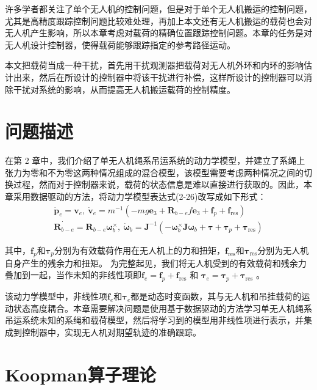 \documentclass[lang=chs, degree=master, blindreview=false, winfonts=true]{yanputhesis}
\begin{document}
许多学者都关注了单个无人机的控制问题，但是对于单个无人机搬运的控制问题，尤其是高精度跟踪控制问题比较难处理，再加上本文还有无人机搬运的载荷也会对无人机产生影响，所以本章考虑对载荷的精确位置跟踪控制问题。本章的任务是对无人机设计控制器，使得载荷能够跟踪指定的参考路径运动。 

本文把载荷当成一种干扰，首先用干扰观测器把载荷对无人机外环和内环的影响估计出来，然后在所设计的控制器中将该干扰进行补偿，这样所设计的控制器可以消除干扰对系统的影响，从而提高无人机搬运载荷的控制精度。

\section{问题描述}
在第 2 章中，我们介绍了单无人机绳系吊运系统的动力学模型，并建立了系绳上张力为零和不为零这两种情况组成的混合模型，该模型需要考虑两种情况之间的切换过程，然而对于控制器来说，载荷的状态信息是难以直接进行获取的。因此，本章采用数据驱动的方法，将动力学模型表达式(2-26)改写成如下形式：
\begin{equation}
	\begin{aligned}
		\dot{\boldsymbol{p}}_e = \boldsymbol{v}_e, \
		\dot{\boldsymbol{v}}_e = m^{-1}\left(-mg\bm{e}_3+\boldsymbol{R}_{b-e}f\bm{e}_3+\bm{f}_p+\bm{f}_{\text{res}}\right) \\
		\dot{\bm{R}_{b-e}} = \bm{R}_{b-e} \bm{\omega}_b^{\times}, \
		\dot{\boldsymbol{\omega}}_b = \boldsymbol{J}^{-1}\left(-\bm{\omega}_b^{\times}\bm{J} \bm{\omega}_b+\boldsymbol{\tau}+ \bm{\tau}_p+ \bm{\tau}_{\text{res}}\right)
	\end{aligned}\label{3-1}
\end{equation}



其中，$\bm{f}_p$和$\bm{\tau}_p$分别为有效载荷作用在无人机上的力和扭矩，$\bm{f}_\text{res}$和$\bm{\tau}_\text{res}$分别为无人机自身产生的残余力和扭矩。
为完整起见，我们将无人机受到的有效载荷和残余力叠加到一起，当作未知的非线性项即$\bm f_e = \bm f_p+ \bm f_{\text{res}}$ 和 $\bm \tau_e = \bm \tau_p+\bm \tau_{\text{res}}$ 。
	
该动力学模型中，非线性项$\bm f_e$和$\bm \tau_e$都是动态时变函数，其与无人机和吊挂载荷的运动状态高度耦合。本章需要解决问题是使用基于数据驱动的方法学习单无人机绳系吊运系统未知的系绳和载荷模型，然后将学习到的模型用非线性项进行表示，并集成到控制器中，实现无人机对期望轨迹的准确跟踪。 




\section{Koopman算子理论}
\end{document}
